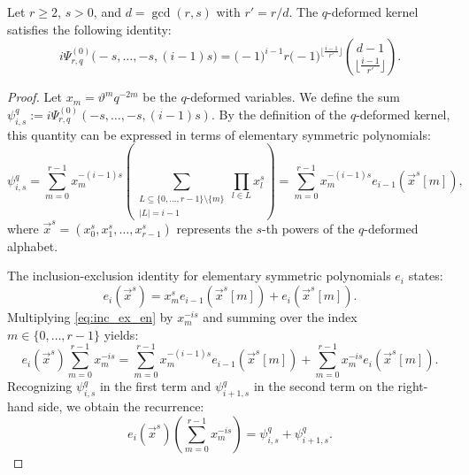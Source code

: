 \documentclass[10pt,a4paper]{amsart}
\renewcommand{\theta}{\vartheta}
\begin{document}
				\begin{lemma}\label{l:Aq4_q}
					{Let $r \geq 2$, $s > 0$, and $d = \gcd(r, s)$ with $r' = r/d$. The $q$-deformed kernel satisfies the following identity:
						\begin{equation}
							i \Psi^{(0)}_{r,q}\big(-s, \dots, -s, (i-1)s\big) = \big(-1\big)^{i-1} r \big(-1\big)^{\lfloor \frac{i-1}{r'} \rfloor} \binom{d-1}{\lfloor \frac{i-1}{r'} \rfloor}.
					\end{equation}}
				\end{lemma}

				\begin{proof}
					{Let $x_m = \theta^m q^{-2m}$ be the $q$-deformed  variables. We define the sum $\psi_{i,s}^q := i \Psi^{(0)}_{r,q}(-s, \dots, -s, (i-1)s)$. By the definition of the $q$-deformed kernel, this quantity can be expressed in terms of elementary symmetric polynomials:
						\begin{equation}
							\psi_{i,s}^q = \sum_{m=0}^{r-1} x_m^{-(i-1)s} \left( \sum_{\substack{L \subseteq \{0, \dots, r-1\} \setminus \{m\} \\ |L|=i-1}} \prod_{l \in L} x_l^s \right) = \sum_{m=0}^{r-1} x_m^{-(i-1)s} e_{i-1}(\vec{{x}}^s[m]),
						\end{equation}
						where $\vec{{x}}^s = (x_0^s, x_1^s, \dots, x_{r-1}^s)$ represents the $s$-th powers of the $q$-deformed alphabet.}
					
					{The inclusion-exclusion identity for elementary symmetric polynomials $e_i$ states:
						\begin{equation}\label{eq:inc_ex_en}
							e_i(\vec{{x}}^s) = x_m^s e_{i-1}(\vec{{x}}^s[m]) + e_i(\vec{{x}}^s[m]).
						\end{equation}
						Multiplying \eqref{eq:inc_ex_en} by $x_m^{-is}$ and summing over the index $m \in \{0, \dots, r-1\}$ yields:
						\begin{equation}
							e_i(\vec{{x}}^s) \sum_{m=0}^{r-1} x_m^{-is} = \sum_{m=0}^{r-1} x_m^{-(i-1)s} e_{i-1}(\vec{{x}}^s[m]) + \sum_{m=0}^{r-1} x_m^{-is} e_i(\vec{{x}}^s[m]).
						\end{equation}
						Recognizing $\psi_{i,s}^q$ in the first term and $\psi_{i+1,s}^q$ in the second term on the right-hand side, we obtain the recurrence:
						\begin{equation}\label{eq:rec_q_en}
							e_i(\vec{{x}}^s) \left( \sum_{m=0}^{r-1} x_m^{-is} \right) = \psi_{i,s}^q + \psi_{i+1,s}^q.
					\end{equation}}
					

\end{proof}
\end{document}
